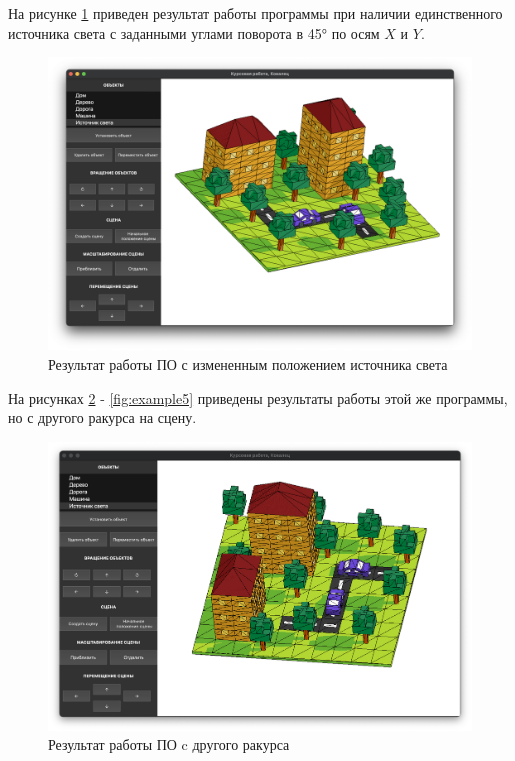 \documentclass[a4paper,14pt, unknownkeysallowed]{extreport}
\begin{document}
\clearpage

На рисунке \ref{fig:example3} приведен результат работы программы при наличии единственного источника света с заданными углами поворота в 45° по осям $X$ и $Y$.

\begin{figure}[h]
	\centering
	\includegraphics[scale=0.36]{img/example3.png}
	\caption{Результат работы ПО с измененным положением источника света}
	\label{fig:example3}
\end{figure} 

На рисунках \ref{fig:example4} - \ref{fig:example5} приведены результаты работы этой же программы, но с другого ракурса на сцену.

\begin{figure}[h]
	\centering
	\includegraphics[scale=0.36]{img/example4.png}
	\caption{Результат работы ПО c другого ракурса}
	\label{fig:example4}
\end{figure} 
\end{document}
